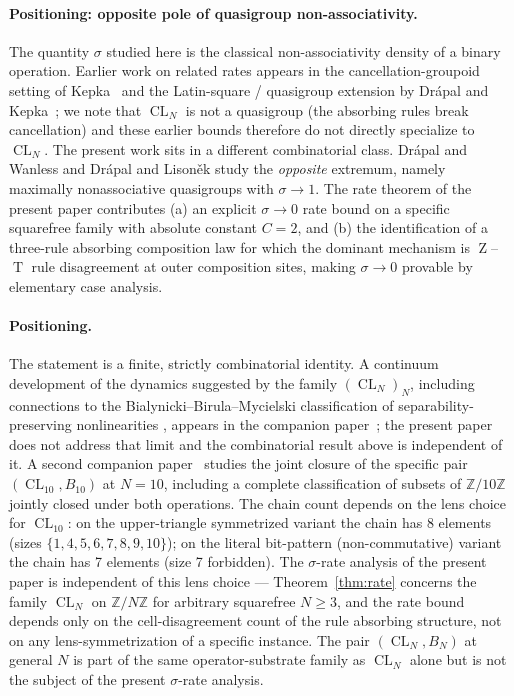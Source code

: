 \documentclass[11pt,reqno]{amsart}
\theoremstyle{plain}
\theoremstyle{definition}
\theoremstyle{remark}
\DeclareMathOperator{\CL}{CL}
\DeclareMathOperator{\HARM}{T}
\DeclareMathOperator{\VOID}{Z}
\begin{document}
\paragraph{Positioning: opposite pole of quasigroup non-associativity.}
The quantity $\sigma$ studied here is the classical
non-associativity density of a binary operation. Earlier work on
related rates appears in the cancellation-groupoid setting of
Kepka~\cite{Kepka1980} and the Latin-square / quasigroup
extension by Dr\'{a}pal and Kepka~\cite{DrapalKepka1985}; we note
that $\CL_N$ is not a quasigroup (the absorbing rules break
cancellation) and these earlier bounds therefore do not directly
specialize to $\CL_N$. The present work sits in a different
combinatorial class.
Dr\'{a}pal and Wanless \cite{DrapalWanless2021a,DrapalWanless2021b} and
Dr\'{a}pal and Lison\v{e}k \cite{DrapalLisonek2020} study the
\emph{opposite} extremum, namely maximally nonassociative
quasigroups with $\sigma\to 1$. The rate theorem of the present paper
contributes (a) an explicit $\sigma\to 0$ rate bound on a specific
squarefree family with absolute constant $C=2$, and (b) the
identification of a three-rule absorbing composition law for which
the dominant mechanism is $\VOID$--$\HARM$ rule disagreement at outer
composition sites, making $\sigma\to 0$ provable by elementary case
analysis.

\paragraph{Positioning.}
The statement is a finite, strictly combinatorial identity. A
continuum development of the dynamics suggested by the family
$(\CL_N)_{N}$, including connections to the Bialynicki--Birula--Mycielski
classification of separability-preserving nonlinearities \cite{BB1976},
appears in the companion paper~\cite{SandersGish2026JCAP}; the
present paper does not address that limit and the combinatorial result
above is independent of it. A second companion
paper~\cite{SandersGish2026FourCore} studies the joint closure of the
specific pair $(\CL_{10}, B_{10})$ at $N=10$, including a complete
classification of subsets of $\mathbb{Z}/10\mathbb{Z}$ jointly closed
under both operations. The chain count depends on the lens choice for $\CL_{10}$: on the upper-triangle symmetrized variant the chain has 8 elements (sizes $\{1,4,5,6,7,8,9,10\}$); on the literal bit-pattern (non-commutative) variant the chain has 7 elements (size 7 forbidden). The $\sigma$-rate analysis of the present paper is independent of this lens choice — Theorem~\ref{thm:rate} concerns the family $\CL_N$ on $\mathbb{Z}/N\mathbb{Z}$ for arbitrary squarefree $N\ge 3$, and the rate bound depends only on the cell-disagreement count of the rule absorbing structure, not on any lens-symmetrization of a specific instance. The pair
$(\CL_N, B_N)$ at general $N$ is part of the same operator-substrate
family as $\CL_N$ alone but is not the subject of the present
$\sigma$-rate analysis.
\end{document}
